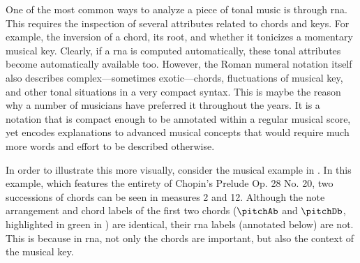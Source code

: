 
One of the most common ways to analyze a piece of tonal
music is through \gls{rna}. This requires the inspection of
several attributes related to chords and keys. For example,
the inversion of a chord, its root, and whether it tonicizes
a momentary musical key. Clearly, if a \gls{rna} is computed
automatically, these tonal attributes become automatically
available too. However, the Roman numeral notation itself
also describes complex---sometimes exotic---chords,
fluctuations of musical key, and other tonal situations in a
very compact syntax. This is maybe the reason why a number
of musicians have preferred it throughout the years. It is a
notation that is compact enough to be annotated within a
regular musical score, yet encodes explanations to advanced
musical concepts that would require much more words and
effort to be described otherwise.

In order to illustrate this more visually, consider the
musical example in . In this
example, which features the entirety of Chopin's Prelude Op.
28 No. 20, two successions of chords can be seen in measures
2 and 12. Although the note arrangement and chord labels of
the first two chords ($\pitchAb$ and $\pitchDb$, highlighted
in green in ) are identical,
their \gls{rna} labels (annotated below) are not. This is
because in \gls{rna}, not only the chords are important, but
also the context of the musical key.




